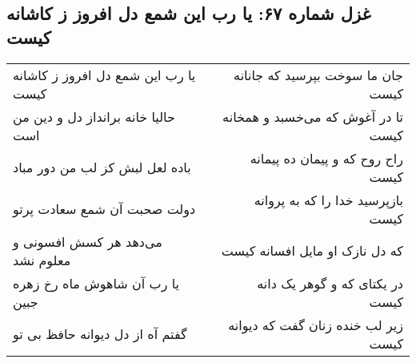 \begin{center}
\section*{غزل شماره ۶۷: یا رب این شمع دل افروز ز کاشانه کیست}
\label{sec:sh067}
\begin{longtable}{l p{0.5cm} r}
یا رب این شمع دل افروز ز کاشانه کیست
&&
جان ما سوخت بپرسید که جانانه کیست
\\
حالیا خانه برانداز دل و دین من است
&&
تا در آغوش که می‌خسبد و همخانه کیست
\\
باده لعل لبش کز لب من دور مباد
&&
راح روح که و پیمان ده پیمانه کیست
\\
دولت صحبت آن شمع سعادت پرتو
&&
بازپرسید خدا را که به پروانه کیست
\\
می‌دهد هر کسش افسونی و معلوم نشد
&&
که دل نازک او مایل افسانه کیست
\\
یا رب آن شاهوش ماه رخ زهره جبین
&&
در یکتای که و گوهر یک دانه کیست
\\
گفتم آه از دل دیوانه حافظ بی تو
&&
زیر لب خنده زنان گفت که دیوانه کیست
\\
\end{longtable}
\end{center}
